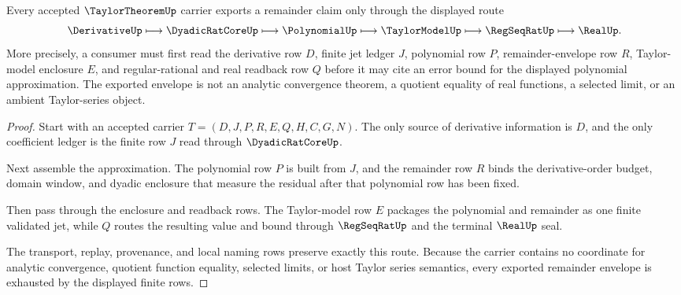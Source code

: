 \begin{theorem}
\label{thm:taylor-theorem-finite-remainder-envelope}
Every accepted $\TaylorTheoremUp$ carrier exports a remainder claim only through the displayed route
$$
\DerivativeUp \longmapsto \DyadicRatCoreUp \longmapsto \PolynomialUp \longmapsto \TaylorModelUp \longmapsto \RegSeqRatUp \longmapsto \RealUp .
$$
More precisely, a consumer must first read the derivative row $D$, finite jet ledger $J$, polynomial row $P$, remainder-envelope row $R$, Taylor-model enclosure $E$, and regular-rational and real readback row $Q$ before it may cite an error bound for the displayed polynomial approximation. The exported envelope is not an analytic convergence theorem, a quotient equality of real functions, a selected limit, or an ambient Taylor-series object.
\end{theorem}
\begin{proof}
Start with an accepted carrier $T=(D,J,P,R,E,Q,H,C,G,N)$. The only source of derivative information is $D$, and the only coefficient ledger is the finite row $J$ read through $\DyadicRatCoreUp$.

Next assemble the approximation. The polynomial row $P$ is built from $J$, and the remainder row $R$ binds the derivative-order budget, domain window, and dyadic enclosure that measure the residual after that polynomial row has been fixed.

Then pass through the enclosure and readback rows. The Taylor-model row $E$ packages the polynomial and remainder as one finite validated jet, while $Q$ routes the resulting value and bound through $\RegSeqRatUp$ and the terminal $\RealUp$ seal.

The transport, replay, provenance, and local naming rows preserve exactly this route. Because the carrier contains no coordinate for analytic convergence, quotient function equality, selected limits, or host Taylor series semantics, every exported remainder envelope is exhausted by the displayed finite rows.
\end{proof}



